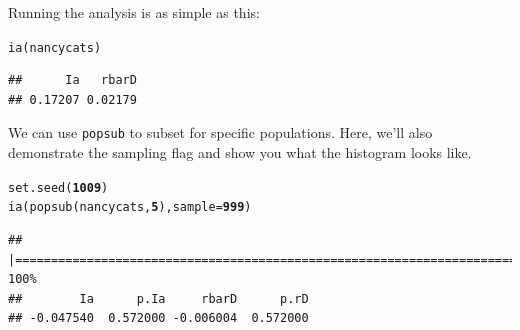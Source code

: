 \documentclass[letterpaper]{article}\usepackage[]{graphicx}\usepackage[]{color}
\makeatletter
\newcommand{\hlnum}[1]{\textcolor[rgb]{0.502,0,0.502}{\textbf{#1}}}%
\newcommand{\hlstd}[1]{\textcolor[rgb]{0,0,0}{#1}}%
\newcommand{\hlkwc}[1]{\textcolor[rgb]{0,0.502,0.753}{#1}}%
\newcommand{\hlkwd}[1]{\textcolor[rgb]{0,0.267,0.4}{#1}}%
\newenvironment{kframe}{%
 \def\at@end@of@kframe{}%
 \ifinner\ifhmode%
  \def\at@end@of@kframe{\end{minipage}}%
  \begin{minipage}{\columnwidth}%
 \fi\fi%
 \def\FrameCommand##1{\hskip\@totalleftmargin \hskip-\fboxsep
 \colorbox{shadecolor}{##1}\hskip-\fboxsep
     \hskip-\linewidth \hskip-\@totalleftmargin \hskip\columnwidth}%
 \MakeFramed {\advance\hsize-\width
   \@totalleftmargin\z@ \linewidth\hsize
   \@setminipage}}%
 {\par\unskip\endMakeFramed%
 \at@end@of@kframe}
\newenvironment{knitrout}{}{} %
\makeatother
\begin{document}
Running the analysis is as simple as this:
\begin{knitrout}\footnotesize
{}\color{fgcolor}\begin{kframe}
\begin{alltt}
\hlkwd{ia}\hlstd{(nancycats)}
\end{alltt}
\begin{verbatim}
##      Ia   rbarD 
## 0.17207 0.02179
\end{verbatim}
\end{kframe}
\end{knitrout}

We can use \texttt{popsub} to subset for specific populations. Here, we'll also demonstrate the sampling flag and show you what the histogram looks like.
\begin{knitrout}\footnotesize
{}\color{fgcolor}\begin{kframe}
\begin{alltt}
\hlkwd{set.seed}\hlstd{(}\hlnum{1009}\hlstd{)}
\hlkwd{ia}\hlstd{(}\hlkwd{popsub}\hlstd{(nancycats,} \hlnum{5}\hlstd{),} \hlkwc{sample} \hlstd{=} \hlnum{999}\hlstd{)}
\end{alltt}
\end{kframe}
\end{knitrout}

\begin{knitrout}\footnotesize
{}\color{fgcolor}\begin{kframe}
\begin{verbatim}
## |================================================================================| 100%
##        Ia      p.Ia     rbarD      p.rD 
## -0.047540  0.572000 -0.006004  0.572000
\end{verbatim}
\end{kframe}
\end{knitrout}
\end{document}
